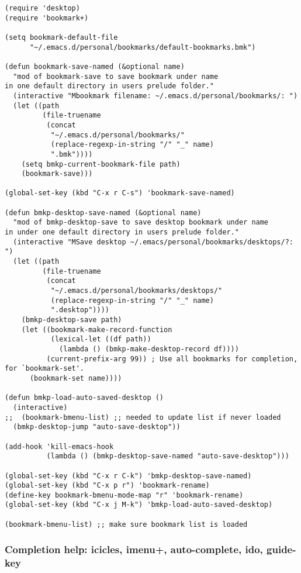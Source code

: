 \documentclass[nofonts]{tufte-handout}
\begin{document}
\begin{verbatim}
(require 'desktop)
(require 'bookmark+)

(setq bookmark-default-file
      "~/.emacs.d/personal/bookmarks/default-bookmarks.bmk")

(defun bookmark-save-named (&optional name)
  "mod of bookmark-save to save bookmark under name
in one default directory in users prelude folder."
  (interactive "Mbookmark filename: ~/.emacs.d/personal/bookmarks/: ")
  (let ((path
         (file-truename
          (concat
           "~/.emacs.d/personal/bookmarks/"
           (replace-regexp-in-string "/" "_" name)
           ".bmk"))))
    (setq bmkp-current-bookmark-file path)
    (bookmark-save)))

(global-set-key (kbd "C-x r C-s") 'bookmark-save-named)

(defun bmkp-desktop-save-named (&optional name)
  "mod of bmkp-desktop-save to save desktop bookmark under name
in under one default directory in users prelude folder."
  (interactive "MSave desktop ~/.emacs/personal/bookmarks/desktops/?: ")
  (let ((path
         (file-truename
          (concat
           "~/.emacs.d/personal/bookmarks/desktops/"
           (replace-regexp-in-string "/" "_" name)
           ".desktop"))))
    (bmkp-desktop-save path)
    (let ((bookmark-make-record-function
           (lexical-let ((df path))
             (lambda () (bmkp-make-desktop-record df))))
          (current-prefix-arg 99)) ; Use all bookmarks for completion, for `bookmark-set'.
      (bookmark-set name))))

(defun bmkp-load-auto-saved-desktop ()
  (interactive)
;;  (bookmark-bmenu-list) ;; needed to update list if never loaded
  (bmkp-desktop-jump "auto-save-desktop"))

(add-hook 'kill-emacs-hook
          (lambda () (bmkp-desktop-save-named "auto-save-desktop")))

(global-set-key (kbd "C-x r C-k") 'bmkp-desktop-save-named)
(global-set-key (kbd "C-x p r") 'bookmark-rename)
(define-key bookmark-bmenu-mode-map "r" 'bookmark-rename)
(global-set-key (kbd "C-x j M-k") 'bmkp-load-auto-saved-desktop)

(bookmark-bmenu-list) ;; make sure bookmark list is loaded
\end{verbatim}

\subsubsection{Completion help: icicles, imenu+, auto-complete, ido, guide-key}
\label{sec-1-11-6}
\end{document}
